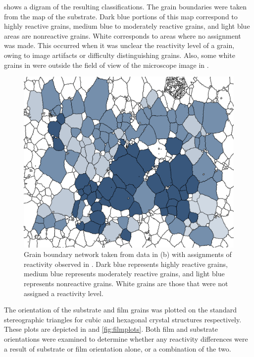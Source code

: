  shows a digram of the resulting classifications. The grain
boundaries were taken from the  map of the substrate. Dark blue portions of
this map correspond to highly reactive grains, medium blue to moderately reactive grains,
and light blue areas are nonreactive grains. White corresponds to areas where no
assignment was made. This occurred when it was unclear the reactivity level of a grain,
owing to image artifacts or difficulty distinguishing grains. Also, some white grains in
 were outside the field of view of the microscope image in
.
\begin{figure}
	\includegraphics[width=\textwidth]{labeledgrains.pdf}
		\caption[Reactivity assignments for film]{%
			Grain boundary network taken from  data in 
			(b) with assignments of reactivity
			observed in . Dark blue represents 
			highly reactive grains, medium blue represents moderately
			reactive grains, and light blue represents nonreactive 
			grains. White grains are those that were not assigned a 
			reactivity level.}
	\label{fig:labeledgrains}
\end{figure}

The orientation of the substrate and film grains was plotted on the standard stereographic
triangles for cubic and hexagonal crystal structures respectively. These plots are
depicted in  and \ref{fig:filmplots}. Both film and substrate
orientations were examined to determine whether any reactivity differences were a result
of substrate or film orientation alone, or a combination of the two.

